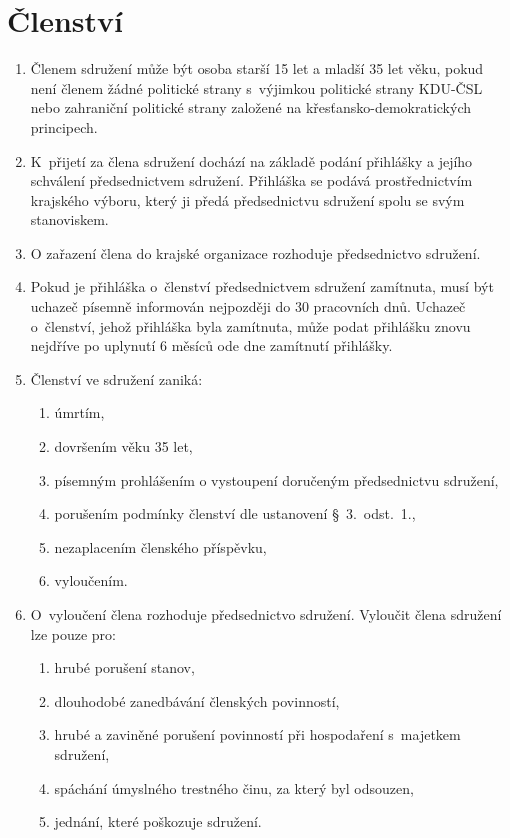 \documentclass[a4paper]{article}
\begin{document}
\section{Členství}
    \begin{enumerate}
    \item Členem sdružení může být osoba starší 15 let a mladší 35 let věku,
        pokud není členem žádné politické strany s~výjimkou politické strany
        KDU-ČSL nebo zahraniční politické strany založené na
        křesťansko-demokratických principech.

    \item K~přijetí za člena sdružení dochází na základě podání přihlášky a
        jejího schválení předsednictvem sdružení. Přihláška se podává
        prostřednictvím krajského výboru, který ji předá předsednictvu
        sdružení spolu se svým stanoviskem.

    \item O zařazení člena do krajské organizace rozhoduje předsednictvo
        sdružení.

    \item Pokud je přihláška o~členství předsednictvem sdružení zamítnuta,
        musí být uchazeč písemně informován nejpozději do 30 pracovních dnů.
        Uchazeč o~členství, jehož přihláška byla zamítnuta, může podat
        přihlášku znovu nejdříve po uplynutí 6 měsíců ode dne zamítnutí
        přihlášky.

    \item Členství ve sdružení zaniká:
        \begin{enumerate}
        \item úmrtím,
        \item dovršením věku 35 let,
        \item písemným prohlášením o vystoupení doručeným předsednictvu
            sdružení,
        \item porušením podmínky členství dle ustanovení \S~3.~odst.~1.,
        \item nezaplacením členského příspěvku,
        \item vyloučením.
        \end{enumerate}

    \item O~vyloučení člena rozhoduje předsednictvo sdružení. Vyloučit člena
        sdružení lze pouze pro:
        \begin{enumerate}
        \item hrubé porušení stanov,
        \item dlouhodobé zanedbávání členských povinností,
        \item hrubé a zaviněné porušení povinností při hospodaření s~majetkem
            sdružení,
        \item spáchání úmyslného trestného činu, za který byl odsouzen,
        \item jednání, které poškozuje sdružení.
        \end{enumerate}


\end{enumerate}
\end{document}
